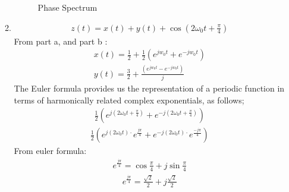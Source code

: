 \documentclass[10pt,a4paper, margin=1in]{article}
\begin{document}
\begin{enumerate}
\begin{enumerate}
    \begin{figure} [h!]
        \centering
        \caption{Phase Spectrum}
        \label{fig:q2}
    \end{figure}
    \item %
     \begin{align*}
        z(t) = x(t) + y(t) + \cos({2\omega_0 t+\frac{\pi}{4}})
    \end{align*}
    From part a, and part b :
    \begin{align*}
        x(t) = \frac{1}{2} + \frac{1}{2}(e^{jw_0t} + e^{-jw_0t})\\
        y(t) = \frac{3}{2} + \frac{(e^{jw_0t} - e^{-jw_0t})}{j}
    \end{align*}
    The Euler formula provides us the representation of a periodic function in terms of harmonically related complex exponentials, as follows;
    \begin{align*}
        \frac{1}{2}(e^{j(2\omega_0t+\frac{\pi}{4})}+e^{-j(2\omega_0t+\frac{\pi}{4})})
    \end{align*}
    \begin{align*}
        \frac{1}{2}(e^{j(2\omega_0t)\cdot}e^{\frac{j\pi}{4}}+e^{-j(2\omega_0t)\cdot}e^{\frac{-j\pi}{4}})
    \end{align*}
    From euler formula:
    \begin{align*}
        e^{\frac{j\pi}{4}} = \cos{\frac{\pi}{4}} + j\sin{\frac{\pi}{4}}
    \end{align*}
    \begin{align*}
        e^{\frac{j\pi}{4}} = \frac{\sqrt{2}}{2} + j\frac{\sqrt{2}}{2}
    \end{align*}

\end{enumerate}
\end{enumerate}
\end{document}

